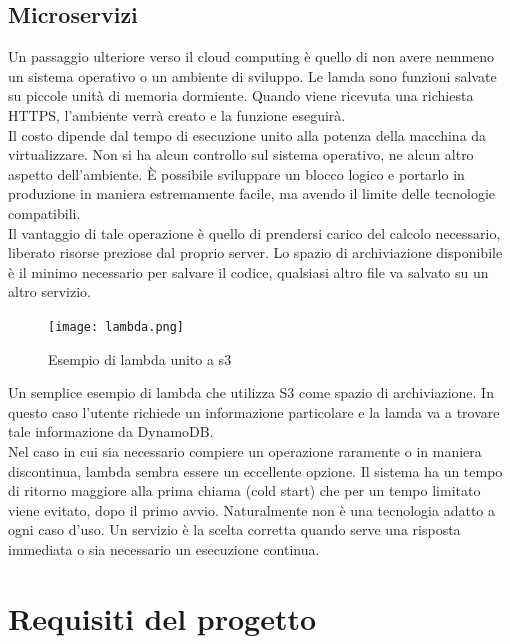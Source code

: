 \documentclass[12pt]{article}
\begin{document}
\subsection{Microservizi}
Un passaggio ulteriore verso il cloud computing è quello di non avere nemmeno 
un sistema operativo o un ambiente di sviluppo.
Le lamda sono funzioni salvate su piccole unità di memoria dormiente. 
Quando viene ricevuta una richiesta HTTPS, l'ambiente verrà creato e la 
funzione eseguirà. 
\\ Il costo dipende dal tempo di esecuzione unito alla potenza della macchina 
da virtualizzare. 
Non si ha alcun controllo sul sistema operativo, ne alcun altro aspetto 
dell'ambiente.
È possibile sviluppare un blocco logico e portarlo in produzione in maniera 
estremamente facile, ma avendo il limite delle tecnologie compatibili.
\\ Il vantaggio di tale operazione è quello di prendersi carico del calcolo 
necessario, liberato risorse preziose dal proprio server. 
Lo spazio di archiviazione disponibile è il minimo necessario per salvare il 
codice, qualsiasi altro file va salvato su un altro servizio.
\begin{figure}[H]
\texttt{[image: lambda.png]}
\centering
\caption{Esempio di lambda unito a s3}
\end{figure}
Un semplice esempio di lambda che utilizza S3 come spazio di archiviazione. 
In questo caso l'utente richiede un informazione particolare e la lamda 
va a trovare tale informazione da DynamoDB. 
\\ Nel caso in cui sia necessario compiere un operazione raramente o in maniera 
discontinua, lambda sembra essere un eccellente opzione. 
Il sistema ha un tempo di ritorno maggiore alla prima chiama (cold start)
che per un tempo limitato viene evitato, dopo il primo avvio.
Naturalmente non è una tecnologia adatto a ogni caso d'uso. 
Un servizio è la scelta corretta 
quando serve una risposta immediata o sia necessario un esecuzione continua.

\section{Requisiti del progetto}
\end{document}
